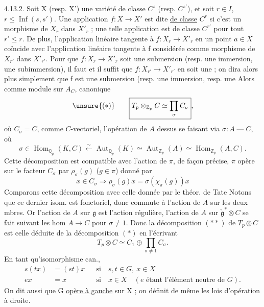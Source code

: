 4.13.2. Soit X (resp. X') une variété de classe $C^s$ (resp. $C^{s'}$), et soit $r\in I$, $r\leq\operatorname{Inf}(s,s')$. Une application $f:X\longrightarrow X'$ est dite \uline{de classe} $C^r$ si c'est un morphisme de $X_r$ dans $X'_r$ ; une telle application est de classe $C^{r'}$ pour tout $r'\leq r$. De plus, l'application linéaire tangente à $f:X_r\longrightarrow X'_r$ en un point $a\in X$ coïncide avec l'application linéaire tangente à f considérée comme morphisme de $X_{r'}$ dans $X'_{r'}$. Pour que $f:X_r\longrightarrow X'_r$ soit une submersion (resp. une immersion, une subimmersion), il faut et il suffit que $f:X_{r'}\longrightarrow X'_{r'}$ en soit une ; on dira alors plus simplement que f est une submersion (resp. une immersion, resp. une
Alors comme module sur $A_C$,   canonique
\[
\unsure{(*)}\qquad\boxed{T_p\otimes_{\mathbb Z_p}C\simeq\prod_\sigma C_\sigma},
\]
où $C_\sigma=C$, comme $C$-vectoriel, l'opération de $A$ dessus se faisant via $\sigma:A\mathrel{\text{---}}C$, où
\[
\sigma\in\operatorname{Hom}_{\mathbb Q_p}(K,C)\xleftarrow{\sim}\operatorname{Aut}_{\mathbb Q_p}(K)\simeq\operatorname{Aut}_{\mathbb Z_p}(A)\simeq\operatorname{Hom}_{\mathbb Z_p}(A,C).
\]
\margin{$*$}
Cette décomposition est compatible avec l'action de $\pi$, de façon précise, $\pi$ opère sur le facteur $C_\sigma$ par $\rho_\sigma(g)$ ($g\in\pi$) donné par
\[
x\in C_\sigma\Longrightarrow\rho_\sigma(g)x=\sigma(\chi_\pi(g))x
\]
Comparons cette décomposition avec celle donnée par le théor. de Tate
Notons que ce dernier isom. est fonctoriel, donc commute à l'action de $A$ sur les deux mbres. Or  l'action de $A$ sur $\mathfrak g$ est l'action régulière, l'action de $A$ sur $\check{\mathfrak g}^{*}\otimes C$ se fait suivant les hom $A\longrightarrow C$ pour $\sigma\ne1$. Donc la décomposition $(**)$ de $T_p\otimes C$ est celle déduite de la décomposition $(*)$ en  l'écrivant
\[
T_p\otimes C\simeq C_1\oplus\prod_{\sigma\ne1}C_\sigma.
\]
 En tant qu'isomorphisme can., 
\[
\begin{aligned}
s(tx)&=(st)x&&\text{si}\quad s,t\in G,\ x\in X\\
ex&=x&&\text{si}\quad x\in X\quad(e\text{ étant l'élément neutre de }G).
\end{aligned}
\]
On dit aussi que G \uline{opère à gauche} sur X ; on définit de même les lois d'opération à droite.

